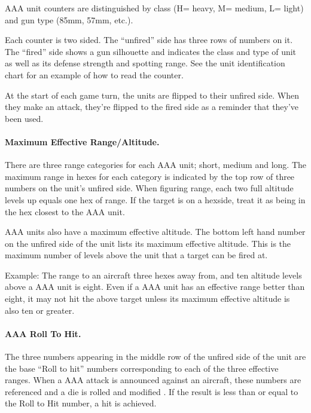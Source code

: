 

AAA unit counters are distinguished by class (H= heavy, M= medium, L= light) and gun type (85mm, 57mm, etc.).

Each counter is two sided. The “unfired” side has three rows of numbers on it. The “fired” side shows a gun silhouette and indicates the class and type of unit as well as its defense strength and spotting range. See the unit identification chart for an example of how to read the counter.

At the start of each game turn, the units are flipped to their unfired side. When they make an attack, they're flipped to the fired side as a reminder that they've been used.

\paragraph{Maximum Effective Range/Altitude.} There are three range categories for each AAA unit; short, medium and long. The maximum range in hexes for each category is indicated by the top row of three numbers on the unit's unfired side. When figuring range, each two full altitude levels up equals one hex of range. If the target is on a hexside, treat it as being in the hex closest to the AAA unit.

AAA units also have a maximum effective altitude. The bottom left hand number on the unfired side of the unit lists its maximum effective altitude. This is the maximum number of levels above the unit that a target can be fired at.

Example: The range to an aircraft three hexes away from, and ten altitude levels above a AAA unit is eight. Even if a AAA unit has an effective range better than eight, it may not hit the above target unless its maximum effective altitude is also ten or greater.

\paragraph{AAA Roll To Hit.} 


The three numbers appearing in the middle row of the unfired side of the unit are the base “Roll to hit” numbers corresponding to each of the three effective ranges. When a AAA attack is announced against an aircraft, these numbers are referenced and a die is rolled and modified . If the result is less than or equal to the Roll to Hit number, a hit is achieved.

